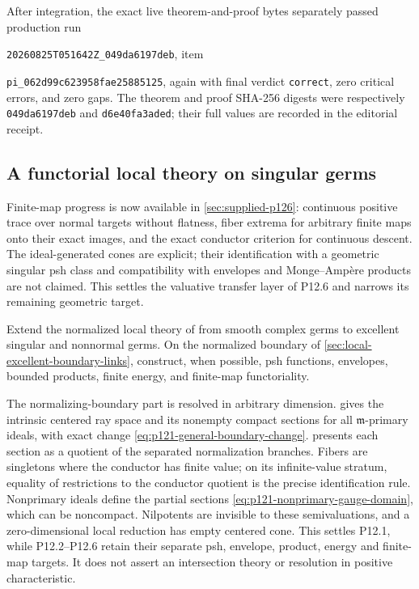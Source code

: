 After integration, the exact live theorem-and-proof bytes separately passed
production run
\par\nolinkurl{20260825T051642Z_049da6197deb}, item
\par\nolinkurl{pi_062d99c623958fae25885125}, again with final verdict
\texttt{correct}, zero critical errors, and zero gaps.  The theorem and
proof SHA-256 digests were respectively
\texttt{049da6197deb} and \texttt{d6e40fa3aded}; their full values are
recorded in the editorial receipt.

\subsection{A functorial local theory on singular germs}
\label{sec:ch72-singular-local}

Finite-map progress is now available in \cref{sec:supplied-p126}:
continuous positive trace over normal targets without flatness, fiber
extrema for arbitrary finite maps onto their exact images, and the exact
conductor criterion for continuous descent. The ideal-generated cones
are explicit; their identification with a geometric singular psh class
and compatibility with envelopes and Monge--Amp\`ere products are not
claimed. This settles the valuative transfer layer of P12.6 and narrows
its remaining geometric target.

\begin{problem}\label{prob:frontier-singular-local}
Extend the normalized local theory of
 from smooth complex germs to excellent
singular and nonnormal germs. On the normalized boundary of
\cref{sec:local-excellent-boundary-links}, construct, when possible,
psh functions, envelopes, bounded products, finite energy, and finite-map
functoriality.
\end{problem}

The normalizing-boundary part is resolved in arbitrary dimension.
 gives the intrinsic centered ray
space and its nonempty compact sections for all \(\mathfrak m\)-primary
ideals, with exact change \eqref{eq:p121-general-boundary-change}.
 presents each section as a
quotient of the separated normalization branches. Fibers are singletons
where the conductor has finite value; on its infinite-value stratum,
equality of restrictions to the conductor quotient is the precise
identification rule. Nonprimary ideals define the partial sections
\eqref{eq:p121-nonprimary-gauge-domain}, which can be noncompact.
Nilpotents are invisible to these semivaluations, and a zero-dimensional
local reduction has empty centered cone. This settles P12.1, while
P12.2--P12.6 retain their separate psh, envelope, product, energy and
finite-map targets. It does not assert an intersection theory or
resolution in positive characteristic.

